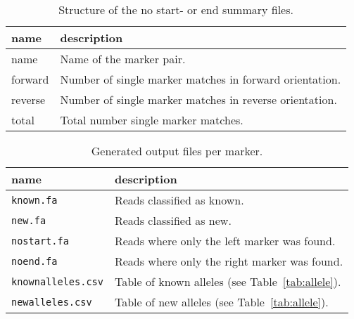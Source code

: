 \documentclass{article}
\begin{document}
\begin{table}[h]
  \caption{Structure of the no start- or end summary files.}
  \label{tab:nostartend}
  \begin{center}
    \begin{tabular}{l|l}
      name & description\\
      \hline
      name    & Name of the marker pair.\\
      forward & Number of single marker matches in forward orientation.\\
      reverse & Number of single marker matches in reverse orientation.\\
      total   & Total number single marker matches.\\
    \end{tabular}
  \end{center}
\end{table}

\begin{table}[h]
  \caption{Generated output files per marker.}
  \label{tab:output}
  \begin{center}
    \begin{tabular}{l|l}
      name & description\\
      \hline
      \texttt{known.fa}         & Reads classified as known.\\
      \texttt{new.fa}           & Reads classified as new.\\
      \texttt{nostart.fa}       & Reads where only the left marker was found.\\
      \texttt{noend.fa}         & Reads where only the right marker was
        found.\\
      \texttt{knownalleles.csv} & Table of known alleles (see
        Table~\ref{tab:allele}).\\
      \texttt{newalleles.csv}   & Table of new alleles (see
        Table~\ref{tab:allele}).\\
    \end{tabular}
  \end{center}
\end{table}
\end{document}
